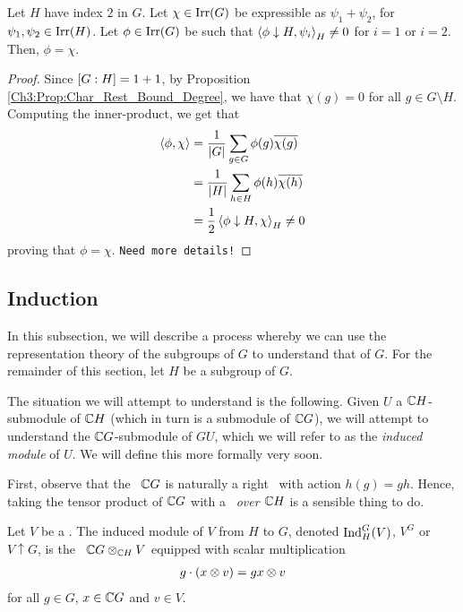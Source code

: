 \begin{proposition}
    Let $H$ have index $2$ in $G$. Let $\chi \in \operatorname{Irr}\!\left( G \right)$ be expressible as $\psi_1 + \psi_2$, for $\psi_1, \psi_2 \in \operatorname{Irr}\!\left( H \right)$. Let $\phi \in \operatorname{Irr}\!\left( G \right)$ be such that $\left\langle \phi \downarrow H, \psi_i \right\rangle_H \neq 0$ for $i=1$ or $i=2$. Then, $\phi = \chi$.
\end{proposition}
\begin{proof}
    Since $\left[ G : H \right] = 1 + 1$, by Proposition \ref{Ch3:Prop:Char_Rest_Bound_Degree}, we have that $\chi(g) = 0$ for all $g \in G \setminus H$. Computing the inner-product, we get that
    \begin{align*}
        \left\langle \phi, \chi \right\rangle &= \frac{1}{\left\lvert G \right\rvert} \sum_{g \in G} \phi(g) \overline{\chi(g)} \\
        &= \frac{1}{\left\lvert H \right\rvert} \sum_{h \in H} \phi(h) \overline{\chi(h)} \\
        &= \frac{1}{2} \left\langle \phi \downarrow H, \chi \right\rangle_H \neq 0
    \end{align*}
    proving that $\phi = \chi$. \verb|Need more details!|
\end{proof}

\subsection{Induction}

In this subsection, we will describe a process whereby we can use the representation theory of the subgroups of $G$ to understand that of $G$. For the remainder of this section, let $H$ be a subgroup of $G$.

The situation we will attempt to understand is the following. Given $U$ a $\mathbb{C} H$-submodule of $\mathbb{C} H$ (which in turn is a submodule of $\mathbb{C} G$), we will attempt to understand the $\mathbb{C} G$-submodule of $G U$, which we will refer to as the \emph{induced module} of $U$. We will define this more formally very soon.

First, observe that the \CGM\ $\mathbb{C} G$ is naturally a right \CHM\ with action $h(g) = gh$. Hence, taking the tensor product of $\mathbb{C} G$ with a \CHM\ \textit{over $\mathbb{C} H$} is a sensible thing to do.

\begin{boxdefinition}
    Let $V$ be a \CHM. The induced module of $V$ from $H$ to $G$, denoted $\operatorname{Ind}_H^G(V)$, $V^G$ or $V \uparrow G$, is the \CGM\ $\mathbb{C} G \otimes_{\mathbb{C} H} V$ equipped with scalar multiplication
    \begin{align}
        g \cdot \left( x \otimes v \right) = gx \otimes v
    \end{align}
    for all $g \in G$, $x \in \mathbb{C} G$ and $v \in V$.
\end{boxdefinition}

